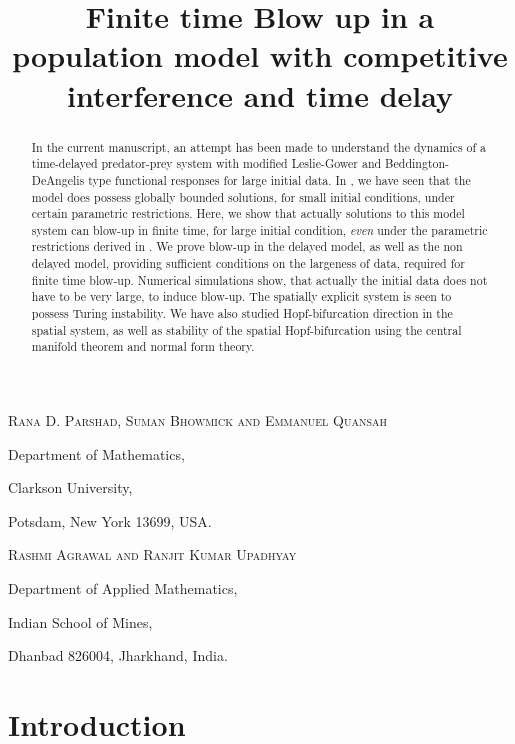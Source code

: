 \documentclass[10pt]{amsart}
\title[blow-up in delay model ]
{Finite time Blow up in a population model with competitive interference and time delay}
\author[  Parshad, Bhowmick, Quansah, Agrawal, Upadhyay. ]{}
\theoremstyle{definition}
\begin{document}
\maketitle

\centerline{\scshape 
 Rana D. Parshad, Suman Bhowmick and Emmanuel Quansah}
{
\footnotesize
 \centerline{Department of Mathematics,}
 \centerline{Clarkson University,}
   \centerline{ Potsdam, New York 13699, USA.}
 }

   \medskip
\centerline{\scshape Rashmi Agrawal and Ranjit Kumar Upadhyay }
{\footnotesize
 \centerline{Department of Applied Mathematics,}
 \centerline{Indian School of Mines,}
   \centerline{ Dhanbad 826004, Jharkhand, India.}
    
}

\begin{abstract}
In the current manuscript, an attempt has been made to understand the dynamics of a time-delayed predator-prey system with modified Leslie-Gower and Beddington-DeAngelis type functional responses for large initial data. In \cite{RK15}, we have seen that the model does possess globally bounded solutions, for small initial conditions, under certain parametric restrictions. Here, we show that actually solutions to this model system can blow-up in finite time, for large initial condition, \emph{even} under the parametric restrictions derived in \cite{RK15}. We prove blow-up in the delayed model, as well as the non delayed model, providing sufficient conditions on the largeness of data, required for finite time blow-up. Numerical simulations show, that actually the initial data does not have to be very large, to induce blow-up. The spatially explicit system is seen to possess Turing instability. We have also studied Hopf-bifurcation direction in the spatial system, as well as stability of the spatial Hopf-bifurcation using the central manifold theorem and normal form theory. 
\end{abstract}

\section{Introduction}
\end{document}
